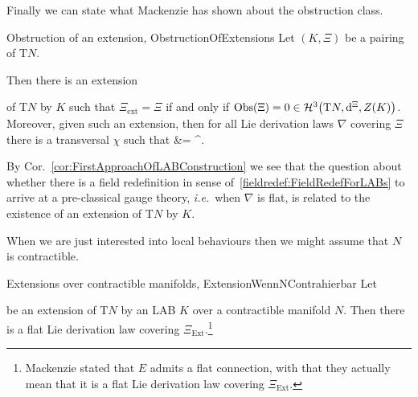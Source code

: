 \documentclass[preprint]{elsarticle}
\def\bas#1\eas{\begin{align*}#1\end{align*}}
\theoremstyle{plain}
\theoremstyle{remark}
\theoremstyle{definition}
\begin{document}
Finally we can state what Mackenzie has shown about the obstruction class.

\begin{theorems}{Obstruction of an extension, \newline \cite[\S 7.3, Proposition 7.3.6, page 279, Corollary 7.3.9 and the comment afterwards, page 281; replace $A$ with $\mathrm{T}N$ and $A^\prime$ with $E$]{mackenzieGeneralTheory}}{ObstructionOfExtensions}
Let $(K, \Xi)$ be a pairing of $\mathrm{T}N$.

Then there is an extension
\begin{center}
\end{center}
of $\mathrm{T}N$ by $K$ such that $\Xi_{\mathrm{ext}} = \Xi$ if and only if $\mathrm{Obs}(\Xi) = 0 \in \mathcal{H}^3\mleft(\mathrm{T}N, \mathrm{d}^\Xi, Z(K)\mright)$. Moreover, given such an extension, then for all Lie derivation laws $\nabla$ covering $\Xi$ there is a transversal $\chi$ such that
\bas
\nabla
&=
\nabla^\chi.
\eas
\end{theorems}

By Cor.~\ref{cor:FirstApproachOfLABConstruction} we see that the question about whether there is a field redefinition in sense of~\ref{fieldredef:FieldRedefForLABs} to arrive at a pre-classical gauge theory, \textit{i.e.}~when $\nabla$ is flat, is related to the existence of an extension of $\mathrm{T}N$ by $K$.

When we are just interested into local behaviours then we might assume that $N$ is contractible.

\begin{theorems}{Extensions over contractible manifolds, \newline \cite[\S 8.2, Theorem 8.2.1, replace $A$ with $E$, $L$ with $K$ and $TM$ with $\mathrm{T}N$; page 314]{mackenzieGeneralTheory}}{ExtensionWennNContrahierbar}
Let
\begin{center}
\end{center}
be an extension of $\mathrm{T}N$ by an LAB $K$ over a contractible manifold $N$. Then there is a flat Lie derivation law covering $\Xi_{\mathrm{Ext}}$.\footnote{Mackenzie stated that $E$ admits a flat connection, with that they actually mean that it is a flat Lie derivation law covering $\Xi_{\mathrm{Ext}}$.}
\end{theorems}
\end{document}
